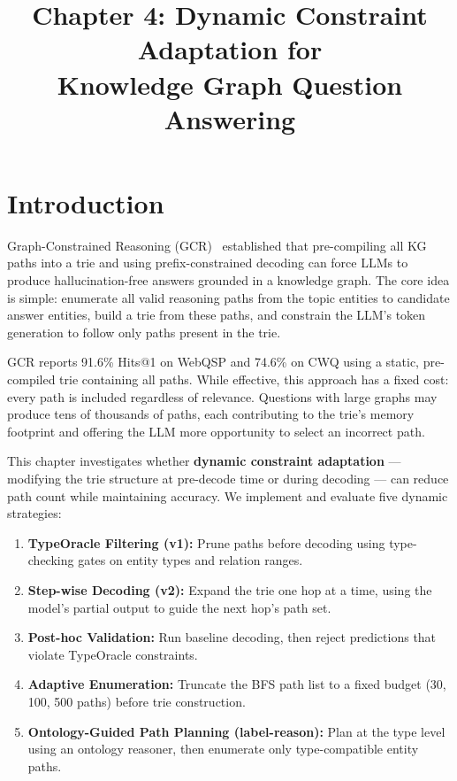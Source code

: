 \documentclass[11pt,twoside]{article}
\title{Chapter 4: Dynamic Constraint Adaptation for\\Knowledge Graph Question Answering}
\author{}
\date{}
\begin{document}
\maketitle

\section{Introduction}
\label{sec:introduction}

Graph-Constrained Reasoning (GCR)~\citep{luo2025-graph-constrained-reasoning}
established that pre-compiling all KG paths into a trie and using
prefix-constrained decoding can force LLMs to produce hallucination-free answers
grounded in a knowledge graph. The core idea is simple: enumerate all valid
reasoning paths from the topic entities to candidate answer entities, build a
trie from these paths, and constrain the LLM's token generation to follow only
paths present in the trie.

GCR reports 91.6\% Hits@1 on WebQSP and 74.6\% on CWQ using a static,
pre-compiled trie containing all paths. While effective, this approach has a
fixed cost: every path is included regardless of relevance. Questions with large
graphs may produce tens of thousands of paths, each contributing to the trie's
memory footprint and offering the LLM more opportunity to select an incorrect
path.

This chapter investigates whether \textbf{dynamic constraint adaptation} ---
modifying the trie structure at pre-decode time or during decoding --- can
reduce path count while maintaining accuracy. We implement and evaluate five
dynamic strategies:

\begin{enumerate}
  \item \textbf{TypeOracle Filtering (v1):} Prune paths before decoding using
        type-checking gates on entity types and relation ranges.
  \item \textbf{Step-wise Decoding (v2):} Expand the trie one hop at a time,
        using the model's partial output to guide the next hop's path set.
  \item \textbf{Post-hoc Validation:} Run baseline decoding, then reject
        predictions that violate TypeOracle constraints.
  \item \textbf{Adaptive Enumeration:} Truncate the BFS path list to a fixed
        budget (30, 100, 500 paths) before trie construction.
  \item \textbf{Ontology-Guided Path Planning (label-reason):} Plan at the type
        level using an ontology reasoner, then enumerate only type-compatible
        entity paths.
\end{enumerate}
\end{document}
